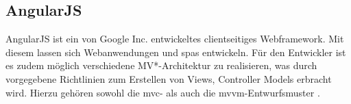 \subsection{AngularJS}
\label{sec:angularjs}
AngularJS ist ein von Google Inc. entwickeltes clientseitiges Webframework. Mit diesem lassen sich Webanwendungen und \ac{spa}s entwickeln. Für den Entwickler ist es zudem möglich verschiedene MV*-Architektur zu realisieren, was durch vorgegebene Richtlinien zum Erstellen von Views, Controller Models erbracht wird. Hierzu gehören sowohl die \ac{mvc}- als auch die \ac{mvvm}-Entwurfsmuster \cite{ste15}.







